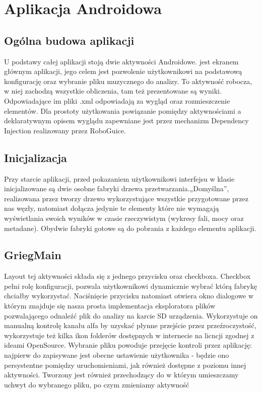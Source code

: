 \chapter{Aplikacja Androidowa}
\section{Ogólna budowa aplikacji}
U podstawy całej aplikacji stoją dwie aktywności Androidowe.  jest ekranem głównym aplikacji, jego celem jest pozwolenie użytkownikowi na podstawową konfigurację oraz wybranie pliku muzycznego do analizy.  To aktywność robocza, w niej zachodzą wszystkie obliczenia, tam też prezentowane są wyniki. Odpowiadające im pliki .xml odpowiadają za wygląd oraz rozmieszczenie elementów. Dla prostoty użytkowania powiązanie pomiędzy aktywnościami a deklaratywnym opisem wyglądu zapewniane jest przez mechanizm Dependency Injection realizowany przez RoboGuice.

\section{Inicjalizacja}
Przy starcie aplikacji, przed pokazaniem użytkownikowi interfejsu w klasie  inicjalizowane są dwie osobne fabryki drzewa przetwarzania.„Domyślna”, realizowana przez  tworzy drzewo wykorzystujące wszystkie przygotowane przez nas węzły, natomiast  dołącza jedynie te elementy które nie wymagają wyświetlania swoich wyników w czasie rzeczywistym (wykresy fali, mocy oraz metadane). Obydwie fabryki gotowe są do pobrania z każdego elementu aplikacji.

\section{GriegMain}
Layout tej aktywności składa się z jednego przycisku oraz checkboxa. Checkbox pełni rolę konfiguracji, pozwala użytkownikowi dynamicznie wybrać którą fabrykę chciałby wykorzystać. Naciśnięcie przycisku natomiast otwiera okno dialogowe w którym znajduje się nasza prosta implementacja eksploratora plików pozwalającego odnaleźć plik do analizy na karcie SD urządzenia. Wykorzystuje on manualną kontrolę kanału alfa by uzyskać płynne przejście przez przeźroczystość, wykorzystuje też kilka ikon folderów dostępnych w internecie na licncji zgodnej z ideami OpenSource. Wybranie pliku powoduje przejęcie kontroli przez aplikację: najpierw do  zapisywane jest obecne ustawienie użytkownika - będzie ono persystentne pomiędzy uruchomieniami, jak również dostępne z poziomu innej aktywności. Tworzony jest również  przechodzący do  w którym umieszczamy uchwyt do wybranego pliku, po czym zmieniamy aktywność


